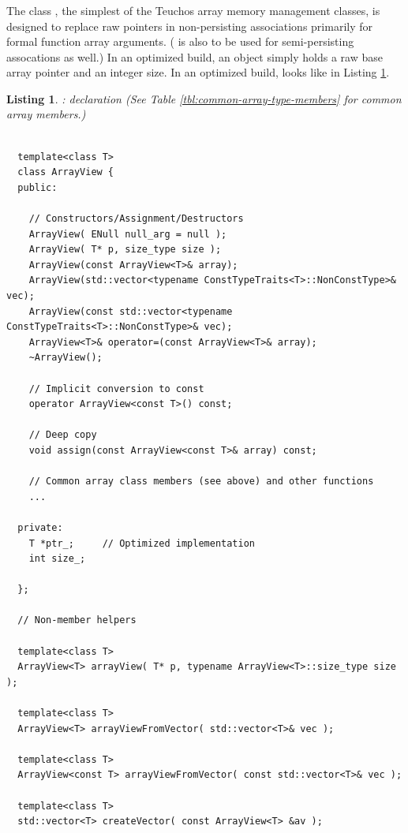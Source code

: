 \documentclass[pdf,ps2pdf,11pt]{SANDreport}
\newtheorem{listing}{Listing}
\begin{document}
%
{}\subsubsection{}
\label{sec:ArrayView}
%

The class {}, the simplest of the Teuchos array
memory management classes, is designed to replace raw pointers in
non-persisting associations primarily for formal function array
arguments.  ({} is also to be used for semi-persisting
assocations as well.)  In an optimized build, an {}
object simply holds a raw base array pointer and an integer size.  In
an optimized build, {} looks like in Listing
{}\ref{listing:ArrayView}.

{}\begin{listing}: {} declaration (See
Table {}\ref{tbl:common-array-type-members} for common array members.)
\label{listing:ArrayView}
{\small\begin{verbatim}

  template<class T>
  class ArrayView {
  public:

    // Constructors/Assignment/Destructors
    ArrayView( ENull null_arg = null );
    ArrayView( T* p, size_type size );
    ArrayView(const ArrayView<T>& array);
    ArrayView(std::vector<typename ConstTypeTraits<T>::NonConstType>& vec);
    ArrayView(const std::vector<typename ConstTypeTraits<T>::NonConstType>& vec);
    ArrayView<T>& operator=(const ArrayView<T>& array);
    ~ArrayView();

    // Implicit conversion to const
    operator ArrayView<const T>() const;

    // Deep copy  
    void assign(const ArrayView<const T>& array) const;

    // Common array class members (see above) and other functions
    ...

  private:
    T *ptr_;     // Optimized implementation
    int size_;

  };

  // Non-member helpers

  template<class T>
  ArrayView<T> arrayView( T* p, typename ArrayView<T>::size_type size );

  template<class T>
  ArrayView<T> arrayViewFromVector( std::vector<T>& vec );

  template<class T>
  ArrayView<const T> arrayViewFromVector( const std::vector<T>& vec );

  template<class T>
  std::vector<T> createVector( const ArrayView<T> &av );


\end{verbatim}}
\end{listing}
\end{document}
